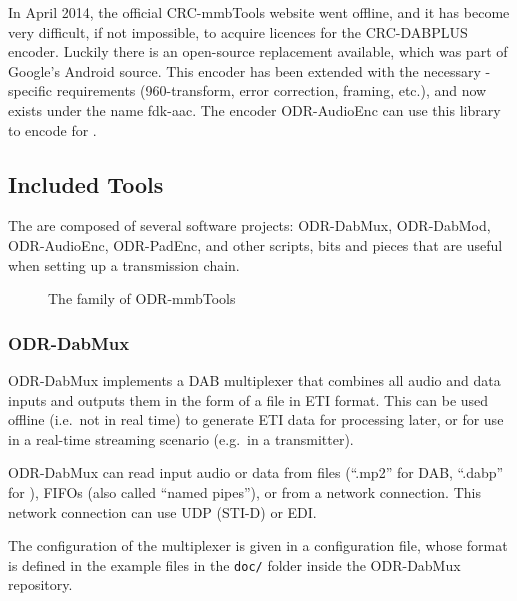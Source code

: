 In April 2014, the official \mbox{CRC-mmbTools} website went offline, and it has
become very difficult, if not impossible, to acquire licences for the
\mbox{CRC-DABPLUS} encoder. Luckily there is an open-source replacement
available, which was part of Google's Android source. This encoder has been
extended with the necessary \dabplus{}-specific requirements (960-transform,
error correction, framing, etc.), and now exists under the name
\mbox{fdk-aac}. The encoder \mbox{ODR-AudioEnc} can use this library to encode for
\dabplus{}.

\subsection{Included Tools}
The \mmbtools are composed of several software projects:
\mbox{ODR-DabMux}, \mbox{ODR-DabMod},
\mbox{ODR-AudioEnc}, \mbox{ODR-PadEnc}, and other scripts, bits and pieces
that are useful when setting up a transmission chain.

\begin{figure}[H]
    \centering
    \caption{The family of ODR-mmbTools}
    \label{fig:family_mmbTools}
\end{figure}

\subsubsection{ODR-DabMux}
ODR-DabMux implements a DAB multiplexer that combines all audio and data inputs
and outputs them in the form of a file in ETI format. This can be used offline
(i.e.~not in real time) to generate ETI data for processing later, or for use in
a real-time streaming scenario (e.g.~in a transmitter).

ODR-DabMux can read input audio or data from files (``.mp2'' for DAB, ``.dabp'' for
\dabplus), FIFOs (also called ``named pipes''), or from a network connection. This
network connection can use UDP (STI-D) or EDI.

The configuration of the multiplexer is given in a configuration file, whose
format is defined in the example files in the \verb+doc/+ folder inside the
ODR-DabMux repository.


